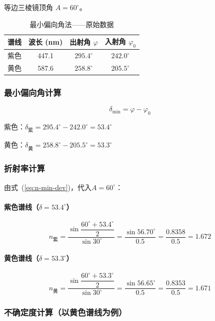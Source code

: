 \documentclass[UTF8]{article}
\begin{document}
等边三棱镜顶角 $A = 60^\circ$。

\begin{table}[H]
\centering
\caption{最小偏向角法——原始数据}
\begin{tabular}{cccc}
\toprule
谱线 & 波长 (nm) & 出射角 $\varphi$ & 入射角 $\varphi_0$ \\
\midrule
紫色 & 447.1 & $295.4^\circ$ & $242.0^\circ$ \\
黄色 & 587.6 & $258.8^\circ$ & $205.5^\circ$ \\
\bottomrule
\end{tabular}
\end{table}

\subsubsection{最小偏向角计算}

\[
\delta_{\min} = \varphi - \varphi_0
\]

紫色：$\delta_{\text{紫}} = 295.4^\circ - 242.0^\circ = 53.4^\circ$

黄色：$\delta_{\text{黄}} = 258.8^\circ - 205.5^\circ = 53.3^\circ$

\subsubsection{折射率计算}

由式~(\ref{eq:n-min-dev})，代入$A = 60^\circ$：

\paragraph{紫色谱线（$\delta = 53.4^\circ$）}

\[
n_{\text{紫}} = \frac{\sin\dfrac{60^\circ + 53.4^\circ}{2}}{\sin 30^\circ}
= \frac{\sin 56.70^\circ}{0.5}
= \frac{0.8358}{0.5}
= \boxed{1.672}
\]

\paragraph{黄色谱线（$\delta = 53.3^\circ$）}

\[
n_{\text{黄}} = \frac{\sin\dfrac{60^\circ + 53.3^\circ}{2}}{\sin 30^\circ}
= \frac{\sin 56.65^\circ}{0.5}
= \frac{0.8353}{0.5}
= \boxed{1.671}
\]

\subsubsection{不确定度计算（以黄色谱线为例）}
\end{document}
